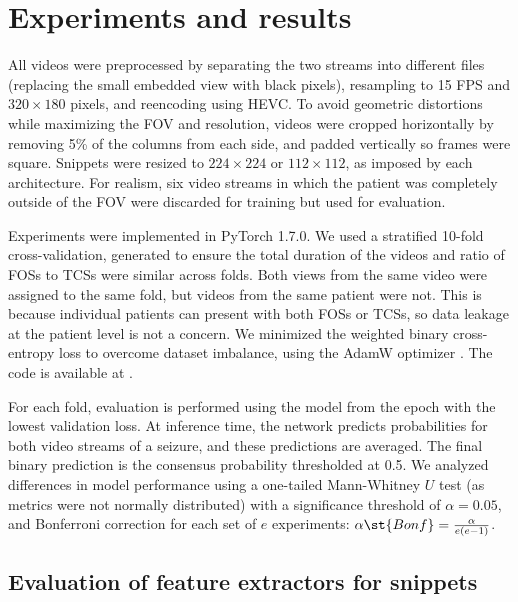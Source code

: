 \section{Experiments and results}

All videos were preprocessed by
separating the two streams into different files (replacing the small embedded view with black pixels),
resampling to 15 \ac{FPS} and $320 \times 180$ pixels,
and reencoding using \ac{HEVC}.
To avoid geometric distortions while maximizing the \ac{FOV} and resolution, videos were cropped horizontally by removing 5\% of the columns from each side, and padded vertically so frames were square.
Snippets were resized to $224 \times 224$ or $112 \times 112$, as imposed by each architecture.
For realism, six video streams in which the patient was completely outside of the \ac{FOV} were discarded for training but used for evaluation.

Experiments were implemented in PyTorch 1.7.0.
We used a stratified 10-fold cross-validation, generated to ensure the total duration of the videos and ratio of \acp{FOS} to \acp{TCS} were similar across folds.
Both views from the same video were assigned to the same fold, but videos from the same patient were not.
This is because individual patients can present with both \acp{FOS} or \acp{TCS}, so data leakage at the patient level is not a concern.
We minimized the weighted binary cross-entropy loss to overcome dataset imbalance, using the AdamW optimizer \cite{loshchilov_decoupled_2019}.
The code is available at .

For each fold, evaluation is performed using the model from the epoch with the lowest validation loss.
At inference time, the network predicts probabilities for both video streams of a seizure, and these predictions are averaged.
The final binary prediction is the consensus probability thresholded at 0.5.
We analyzed differences in model performance using a one-tailed Mann-Whitney $U$ test (as metrics were not normally distributed) with a significance threshold of $\alpha = 0.05$, and Bonferroni correction for each set of $e$ experiments: $\alpha\st{Bonf} = \frac{\alpha}{e (e - 1)}$.


\subsection{Evaluation of feature extractors for snippets}
\label{sec:exp_feat}

